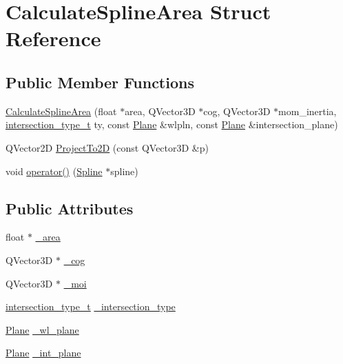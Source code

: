 \hypertarget{structCalculateSplineArea}{\section{Calculate\-Spline\-Area Struct Reference}
\label{structCalculateSplineArea}
}
\subsection*{Public Member Functions}
\begin{DoxyCompactItemize}
\item 
\hyperlink{structCalculateSplineArea_a9a8b34be2a02d20258755dd9b125c9b6}{Calculate\-Spline\-Area} (float $\ast$area, Q\-Vector3\-D $\ast$cog, Q\-Vector3\-D $\ast$mom\-\_\-inertia, \hyperlink{namespaceShipCAD_aa56834b730aafdf2786ddc9a60a046fd}{intersection\-\_\-type\-\_\-t} ty, const \hyperlink{classShipCAD_1_1Plane}{Plane} \&wlpln, const \hyperlink{classShipCAD_1_1Plane}{Plane} \&intersection\-\_\-plane)
\item 
Q\-Vector2\-D \hyperlink{structCalculateSplineArea_a03a0bdc26538e48bf5ca311a3b4ba23a}{Project\-To2\-D} (const Q\-Vector3\-D \&p)
\item 
void \hyperlink{structCalculateSplineArea_a55da994c2b32cad71e5c8c8f21b09ce0}{operator()} (\hyperlink{classShipCAD_1_1Spline}{Spline} $\ast$spline)
\end{DoxyCompactItemize}
\subsection*{Public Attributes}
\begin{DoxyCompactItemize}
\item 
float $\ast$ \hyperlink{structCalculateSplineArea_a2b059a1a694d22a63c94bde86a8ecd6b}{\-\_\-area}
\item 
Q\-Vector3\-D $\ast$ \hyperlink{structCalculateSplineArea_abe01c8bb84cfb1900fa06e9e16fcc575}{\-\_\-cog}
\item 
Q\-Vector3\-D $\ast$ \hyperlink{structCalculateSplineArea_afcd9ae27bc3f89b4fa995f7f1cfd2746}{\-\_\-moi}
\item 
\hyperlink{namespaceShipCAD_aa56834b730aafdf2786ddc9a60a046fd}{intersection\-\_\-type\-\_\-t} \hyperlink{structCalculateSplineArea_aae716b66f114f0217e68efc79ca9cc91}{\-\_\-intersection\-\_\-type}
\item 
\hyperlink{classShipCAD_1_1Plane}{Plane} \hyperlink{structCalculateSplineArea_a0f3126c4f34b545eea5bbce5f340f21c}{\-\_\-wl\-\_\-plane}
\item 
\hyperlink{classShipCAD_1_1Plane}{Plane} \hyperlink{structCalculateSplineArea_a4d0feb7db0aca705a54f2f612290e970}{\-\_\-int\-\_\-plane}
\end{DoxyCompactItemize}


